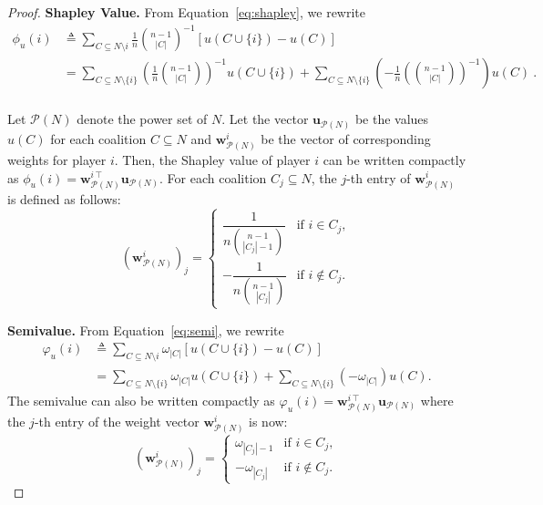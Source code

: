 \begin{proof}

\textbf{Shapley Value.}
From Equation~\eqref{eq:shapley}, we rewrite
\begin{align*}
 \phi_u(i) &\triangleq \sum_{C \subseteq N \setminus i} \frac{1}{n} {\binom{n-1}{|C|}}^{-1} \left[ u(C \cup \{i\}) - u(C) \right]\\
 &= \sum_{C \subseteq N \setminus \{i\}} \left( \frac{1}{n} \binom{n - 1}{|C|} \right)^{-1} u(C \cup \{i\}) + \sum_{C \subseteq N \setminus \{i\}} \left( -\frac{1}{n} \left( \binom{n - 1}{|C|} \right)^{-1} \right) u(C)\ .\\
\end{align*}

Let $\mathcal{P}(N)$ denote the power set of $N$. Let the vector $\mathbf{u}_{\mathcal{P}(N)}$ be the values $u(C)$ for each coalition $C \subseteq N$ and $\mathbf{w}_{\mathcal{P}(N)}^{i}$ be the vector of corresponding weights for player $i$. Then, the Shapley value of player $i$ can be written compactly as
$ \phi_u(i) = \mathbf{w}_{\mathcal{P}(N)}^{i\,\top} \mathbf{u}_{\mathcal{P}(N)} $.
For each coalition $C_j \subseteq N$, the $j$-th entry of $\mathbf{w}_{\mathcal{P}(N)}^{i}$ is defined as follows:
\[
\left( \mathbf{w}_{\mathcal{P}(N)}^{i} \right)_j =
\begin{cases}
\dfrac{1}{n \binom{n-1}{|C_j|-1}} & \text{if } i \in C_j, \\
-\dfrac{1}{n \binom{n-1}{|C_j|}} & \text{if } i \notin C_j.
\end{cases}
\]

\textbf{Semivalue.}
From Equation~\eqref{eq:semi}, we rewrite
\begin{align*}
\varphi_u(i) & \triangleq \sum_{C \subseteq N \setminus i}\omega_{|C|} \left[ u(C \cup \{i\}) - u(C) \right] \\
&= \sum_{C \subseteq N \setminus \{i\}} \omega_{|C|} u(C \cup \{i\}) + \sum_{C \subseteq N \setminus \{i\}} \left(-\omega_{|C|}\right) u(C).
\end{align*}
The semivalue can also be written compactly as $\varphi_u(i) = \mathbf{w}_{\mathcal{P}(N)}^{i\,\top} \mathbf{u}_{\mathcal{P}(N)} $
where the $j$-th entry of the weight vector $\mathbf{w}_{\mathcal{P}(N)}^{i}$ is now:
\[
\left( \mathbf{w}_{\mathcal{P}(N)}^{i} \right)_j =
\begin{cases}
\omega_{|C_j|-1} & \text{if } i \in C_j, \\
-\omega_{|C_j|} & \text{if } i \notin C_j.
\end{cases}
\]


\end{proof}

